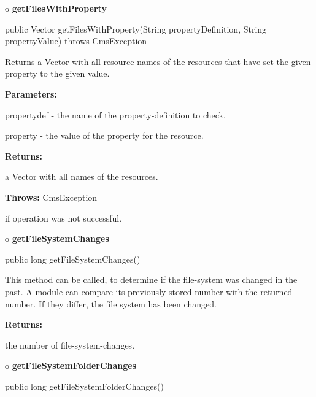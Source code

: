 o {\bf getFilesWithProperty}

\begin{PRE}
 public Vector getFilesWithProperty(String propertyDefinition,
                                    String propertyValue) throws CmsException
\end{PRE}

\begin{description}
\htmlDD Returns a Vector with all resource-names of the resources that have
set the given property to the given value.

\begin{description}
\item {\bf Parameters:}

propertydef - the name of the property-definition to check.

property - the value of the property for the resource.
\item {\bf Returns:}

a Vector with all names of the resources.
\item {\bf Throws:} CmsException

if operation was not successful.
\end{description}

\end{description}

o {\bf getFileSystemChanges}

\begin{PRE}
 public long getFileSystemChanges()
\end{PRE}

\begin{description}
\htmlDD This method can be called, to determine if the file-system was changed
in the past. \htmlBR
A module can compare its previously stored number with the returned number. If
they differ, the file system has been changed.

\begin{description}
\item {\bf Returns:}

the number of file-system-changes.
\end{description}

\end{description}

o {\bf getFileSystemFolderChanges}

\begin{PRE}
 public long getFileSystemFolderChanges()
\end{PRE}

